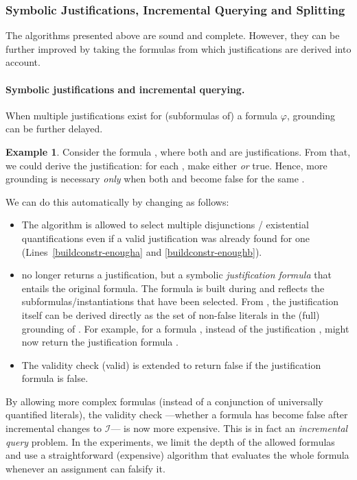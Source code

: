 \documentclass[11pt]{article}
\newcommand{\m}[1]{\ensuremath{#1}\xspace}
\newcommand{\I}{\m{\mathcal{I}}}
\newcommand{\f}{\m{\varphi}}
\theoremstyle{plain}
\theoremstyle{definition}
\theoremstyle{example_basic}
\newtheorem{example}[thm]{Example}
\theoremstyle{example_contd}
\theoremstyle{plain}
\newcommand{\change}[1]{#1}
\begin{document}
\subsubsection{Symbolic Justifications, Incremental Querying and Splitting}\label{ssec:splitting}
The algorithms presented above are sound and complete. \change{However, they can be further improved by taking the formulas from which
justifications are derived into account.}

\paragraph{Symbolic justifications and incremental querying.}
\change{When multiple justifications exist for (subformulas of) a
  formula \f, grounding can be further delayed.}
\begin{example}
Consider the formula , where both
 and  are
justifications. From that, we could derive the justification: for each
, make either  \emph{or}  true. Hence, more grounding is necessary
\emph{only} when both  and  become false for the same .
\end{example}

We can do this automatically by changing \buildconstr as follows: 
\begin{itemize}
  \item The algorithm is allowed to select multiple disjunctions / existential quantifications even if a valid justification was already found for one (Lines~\ref{buildconstr-enougha} and \ref{buildconstr-enoughb}).
  \item \buildconstr no longer returns a justification, but a
    \change{symbolic} \emph{justification formula} that entails the original formula. The formula is built during \buildconstr and reflects the subformulas/instantiations that have been selected. From , the justification itself can be derived directly as the set of non-false literals in the (full) grounding of .
  For example, for a formula ,
  instead of the justification , \buildconstr
  might now return \change{ the justification formula .}
  \item The validity check (\textsf{valid}) is extended to return false if the justification formula is false.
\end{itemize}
By allowing more complex formulas (instead of a conjunction
of universally quantified literals), \change{the validity check
  ---whether a formula has become false after incremental changes to
  \I--- is now more expensive.  This is in fact an \emph{incremental
    query} problem. In the experiments, we limit the depth of the
  allowed formulas and use a straightforward (expensive) algorithm
  that evaluates the whole formula whenever an assignment can falsify
  it.}
  
\end{document}
